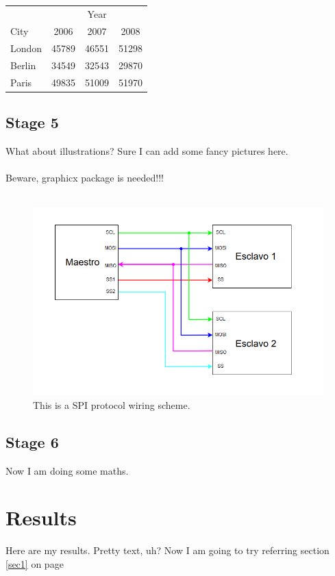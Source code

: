 \documentclass[a4paper,12pt]{article}
\begin{document}
		\\\\\\\\
		\begin{tabular}{l|ccc}
			 & & Year & \\
			\cline{2-4}
			City & 2006 & 2007 & 2008\\
			\hline
			London & 45789 & 46551 & 51298\\
			Berlin & 34549 & 32543 & 29870 \\
			Paris & 49835 & 51009 & 51970 \\
		\end{tabular}

		\subsection{Stage 5}
		What about illustrations? Sure I can add some fancy pictures here. \\\\
		Beware, graphicx package is needed!!!\\\\

		\begin{figure}[h]%
			\centering
			\includegraphics[width=1\textwidth]{Images/SPI-scheme.png}
			\caption{ This is a SPI protocol wiring scheme.}
		\end{figure}
		
		\subsection{Stage 6}
		Now I am doing some maths.


	\section{Results}
	Here are my results. Pretty text, uh?
	Now I am going to try referring section \ref{sec1} on page \pageref{sec1}
\end{document}

